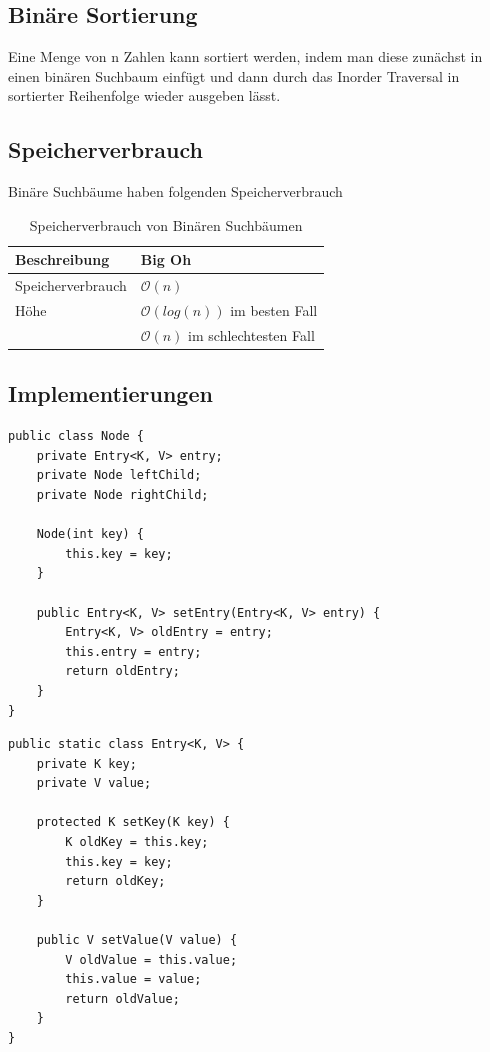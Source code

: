 \clearpage

\subsection{Binäre Sortierung}
Eine Menge von n Zahlen kann sortiert werden, indem man diese zunächst in einen binären Suchbaum einfügt und dann durch das Inorder Traversal in sortierter Reihenfolge wieder ausgeben lässt.


\subsection{Speicherverbrauch}
Binäre Suchbäume haben folgenden Speicherverbrauch
\begin{table}[h]
	\centering
	\begin{tabu} to \linewidth {l l}
		\toprule
		Beschreibung & Big Oh \\
		\midrule
		Speicherverbrauch & $\mathcal{O}(n)$  \\
		Höhe & $\mathcal{O}(log(n))$ im besten Fall \\
		& $\mathcal{O}(n)$ im schlechtesten Fall \\
		\bottomrule
	\end{tabu}
	\caption{Speicherverbrauch von Binären Suchbäumen}
\end{table}

\subsection{Implementierungen}
\begin{lstlisting}[caption=BST Node]
public class Node {
	private Entry<K, V> entry;
	private Node leftChild;
	private Node rightChild;

	Node(int key) {
		this.key = key;
	}

	public Entry<K, V> setEntry(Entry<K, V> entry) {
		Entry<K, V> oldEntry = entry;
		this.entry = entry;
		return oldEntry;
	}
}
\end{lstlisting}

\begin{lstlisting}[caption=BST Entry]
public static class Entry<K, V> {
	private K key;
	private V value;

	protected K setKey(K key) {
		K oldKey = this.key;
		this.key = key;
		return oldKey;
	}

	public V setValue(V value) {
		V oldValue = this.value;
		this.value = value;
		return oldValue;
	}
}
\end{lstlisting}

